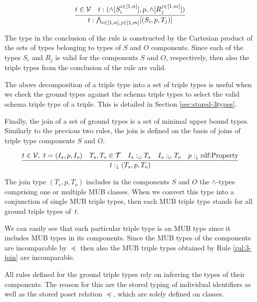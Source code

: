 \documentclass[runningheads]{llncs}
\newcommand{\darr}{\downarrow}
\newcommand{\V}{{\cal V}}
\newcommand{\T}{{\cal T}}
\newcommand{\memo}[1]{}
\begin{document}
\begin{equation}
\label{rul:3-land-transform}
\dfrac{t\in\V\quad t:(\land[S_i^{i\in[1,n]}],p,\land[R_j^{j\in[1,m]}])}
      {t:\bigwedge_{i\in[1,n], j\in[1,m]}[(S_i,p,T_j)]}
\end{equation}

The type in the conclusion of the rule is constructed by the Cartesian
product of the sets of types belonging to types of $S$ and $O$
components. Since each of the types $S_i$ and $R_j$ is valid for the
components $S$ and $O$, respectively, then also the triple types from
the conclusion of the rule are valid.

The above decomposition of a triple type into a set of triple types is
useful when we check the ground types against the schema triple types
to select the valid schema triple type of a triple. This is detailed in
Section \ref{sec:stored-3types}.

Finally, the join of a set of ground types is a set of minimal upper
bound types. Similarly to the previous two rules, the join is defined
on the basis of joins of triple type components $S$ and $O$.

\begin{equation}
\label{rul:3-join}
\dfrac{t\in\V,\ t=(I_s,p,I_o)\quad T_s,T_o\in\T\quad I_s:_\sqcup\/T_s\quad I_o:_\sqcup\/T_o\quad p:_\darr\text{rdf:Property}}
      {t:_\darr\/(T_s,p,T_o)}
\end{equation}

The join type $(T_s,p,T_o)$ includes in the components $S$ and $O$ the
$\land$-types comprising one or multiple MUB classes. When we convert
this type into a conjunction of single MUB triple types, then each MUB
triple type stands for all ground triple types of~$t$.

We can easily see that each particular triple type is an MUB type
since it includes MUB types in its components. Since the MUB types of
the components are incomparable by $\preceq$ then also the MUB triple
types obtained by Rule \ref{rul:3-join} are incomparable.

All rules defined for the ground triple types rely on inferring the
types of their components. The reason for this are the stored typing
of individual identifiers as well as the stored poset relation
$\preceq$, which are solely defined on classes.




\memo{The types of $s$ and $o$ can be any classes $T_s$ and $T_o$ from
  ${\cal I}_c$, while the type of $p$ has to be a class $T_p$ that is
  a subclass of rdf:Property. The typing of a triple $t$ is correct
  since the interpretation of $T$ includes $t$.}
\end{document}
